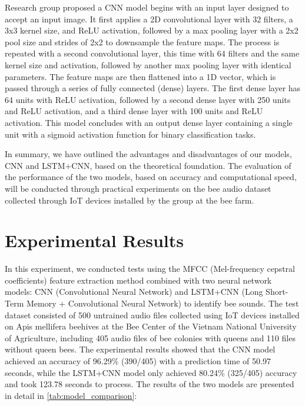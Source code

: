 \documentclass[twocolumn]{article}
\begin{document}
Research group proposed a CNN model begins with an input layer
designed to accept an input image. It first applies a 2D convolutional
layer with 32 filters, a 3x3 kernel size, and ReLU activation,
followed by a max pooling layer with a 2x2 pool size and strides of
2x2 to downsample the feature maps. The process is repeated with a
second convolutional layer, this time with 64 filters and the same
kernel size and activation, followed by another max pooling layer with
identical parameters. The feature maps are then flattened into a
1D vector, which is passed through a series of fully connected
(dense) layers. The first dense layer has 64 units with ReLU
activation, followed by a second dense layer with 250 units and
ReLU activation, and a third dense layer with 100 units and ReLU
activation. This model concludes with an output dense layer containing
a single unit with a sigmoid activation function for binary
classification tasks.

In summary, we have outlined the advantages and disadvantages of our
models, CNN and LSTM+CNN, based on the theoretical foundation. The
evaluation of the performance of the two models, based on accuracy and
computational speed, will be conducted through practical experiments
on the bee audio dataset collected through IoT devices installed by
the group at the bee farm.

\section{Experimental Results}
In this experiment, we conducted tests using the MFCC (Mel-frequency cepstral coefficients)
feature extraction method combined with two neural network models: CNN (Convolutional Neural
Network) and LSTM+CNN (Long Short-Term Memory + Convolutional Neural Network) to identify
bee sounds. The test dataset consisted of 500 untrained audio files collected using IoT
devices installed on Apis mellifera beehives at the Bee Center of the Vietnam National University of Agriculture,
including 405 audio files of bee colonies with queens and 110 files without
queen bees. The experimental results showed that the CNN model achieved an accuracy of
96.29\% (390/405) with a prediction time of 50.97 seconds, while the LSTM+CNN model only
achieved 80.24\% (325/405) accuracy and took 123.78 seconds to process. The results of the
two models are presented in detail in \autoref{tab:model_comparison}:
\end{document}
